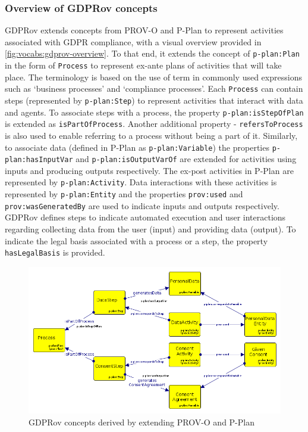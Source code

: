 \subsubsection{Overview of GDPRov concepts}
GDPRov extends concepts from PROV-O and P-Plan to represent activities associated with GDPR compliance, with a visual overview provided in \autoref{fig:vocabs:gdprov-overview}.
To that end, it extends the concept of \texttt{p-plan:Plan} in the form of \texttt{Process} to represent ex-ante plans of activities that will take place. The terminology is based on the use of term in commonly used expressions such as `business processes' and `compliance processes'.
Each \texttt{Process} can contain steps (represented by \texttt{p-plan:Step}) to represent activities that interact with data and agents.
To associate steps with a process, the property \texttt{p-plan:isStepOfPlan} is extended as \texttt{isPartOfProcess}.
Another additional property - \texttt{refersToProcess} is also used to enable referring to a process without being a part of it.
Similarly, to associate data (defined in P-Plan as \texttt{p-plan:Variable}) the properties \texttt{p-plan:hasInputVar} and \texttt{p-plan:isOutputVarOf} are extended for activities using inputs and producing outputs respectively.
The ex-post activities in P-Plan are represented by \texttt{p-plan:Activity}.
Data interactions with these activities is represented by \texttt{p-plan:Entity} and the properties \texttt{prov:used} and \texttt{prov:wasGeneratedBy} are used to indicate inputs and outputs respectively.
GDPRov defines steps to indicate automated execution and user interactions regarding collecting data from the user (input) and providing data (output).
To indicate the legal basis associated with a process or a step, the property \texttt{hasLegalBasis} is provided.
\begin{figure}[htbp]
    \centering
    \includegraphics[width=\linewidth]{img/GDProv_relation_prov_pplan.png}
    \caption{GDPRov concepts derived by extending PROV-O and P-Plan}
    \label{fig:vocabs:gdprov-overview}
\end{figure}


